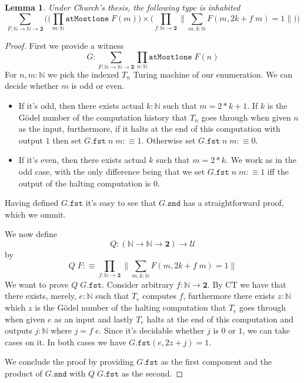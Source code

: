 \documentclass[12pt]{report}
\newtheorem{lem}[thm]{Lemma}
\begin{document}
\begin{lem}\label{405}
Under Church's thesis, the following type is inhabited
$$\sum_{F : \mathbb{N} \rightarrow \mathbb{N} \rightarrow \mathbf{2}} \Big( \big(\prod_{m : \mathbb{N}} \mathtt{atMost1one}\; F(m) \big) \times \big( \prod_{f : \mathbb{N} \rightarrow \mathbf{2}} \big\lVert \sum_{m, k : \mathbb{N}} F(m, 2k+ f\; m) = 1 \big\rVert \big) \Big)$$
\end{lem}
\begin{proof}
First we provide a witness
$$G : \sum_{F : \mathbb{N} \rightarrow \mathbb{N} \rightarrow \mathbf{2} } \prod_{n : \mathbb{N}}\mathtt{atMost1one}\; F(n)$$
For $n, m : \mathbb{N}$ we pick the indexed $T_n$ Turing machine of our enumeration. 
We can decide whether $m$ is odd or even. 
\begin{itemize}
\item If it's odd, then there exists actual $k : \mathbb{N}$ such that $m = 2*k +1$. 
If $k$ is the Gödel number of the computation history that $T_n$ goes through when given $n$ as the input, furthermore, if it halts at the end of this computation with output $1$ then set $G.\mathtt{fst}\; n\; m :\equiv 1$. 
Otherwise set $G.\mathtt{fst}\; n\; m :\equiv 0$.
\item If it's even, then there exists actual $k$ such that $m = 2*k$. 
We work as in the odd case, with the only difference being that we set $G.\mathtt{fst}\; n\; m :\equiv 1$ iff the output of the halting computation is $0$.
\end{itemize}
Having defined $G.\mathtt{fst}$ it's easy to see that $G.\mathtt{snd}$ has a straightforward proof, which we ommit. 

We now define 
$$Q : (\mathbb{N} \rightarrow \mathbb{N} \rightarrow \mathbf{2}) \rightarrow \mathcal{U}$$ 
by 
$$Q\; F :\equiv \prod_{f : \mathbb{N} \rightarrow \mathbf{2}} \big\lVert \sum_{m, k : \mathbb{N}} F(m, 2k+ f\; m) = 1 \big\rVert$$
We want to prove $Q\; G.\mathtt{fst}$. 
Consider arbitrary $f : \mathbb{N} \rightarrow \mathbf{2}$. 
By CT we have that there exists, merely, $e : \mathbb{N}$ such that $T_e$ computes $f$, furthermore there exists $z : \mathbb{N}$ which $z$ is the Gödel number of the halting computation that $T_e$ goes through when given $e$ as an input and lastly $T_e$ halts at the end of this computation and outputs $j : \mathbb{N}$ where $j = f\; e$. 
Since it's decidable whether $j$ is $0$ or $1$, we can take cases on it.
In both cases we have $G.\mathtt{fst} (e, 2z + j) = 1$. 

We conclude the proof by providing $G.\mathtt{fst}$ as the first component and the product of $G.\mathtt{snd}$ with $Q\; G.\mathtt{fst}$ as the second.
\end{proof}
\end{document}

